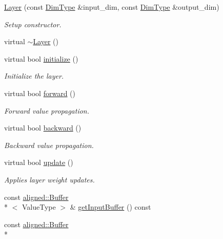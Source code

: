 \begin{DoxyCompactItemize}
\item 
\hyperlink{classffnn_1_1layer_1_1_layer_a693c59cfa760fdd695780c6f44226b88}{Layer} (const \hyperlink{classffnn_1_1layer_1_1internal_1_1_interface_a8d121d0103f254b51e48f7b20a17681f}{Dim\-Type} \&input\-\_\-dim, const \hyperlink{classffnn_1_1layer_1_1internal_1_1_interface_a8d121d0103f254b51e48f7b20a17681f}{Dim\-Type} \&output\-\_\-dim)
\begin{DoxyCompactList}\small\item\em Setup constructor. \end{DoxyCompactList}\item 
virtual \hyperlink{classffnn_1_1layer_1_1_layer_aa466bcb2ac40d059e9b6e40be157d1b4}{$\sim$\-Layer} ()
\item 
virtual bool \hyperlink{classffnn_1_1layer_1_1_layer_ae8a7daa81382a7965b8ab8861da7e522}{initialize} ()
\begin{DoxyCompactList}\small\item\em Initialize the layer. \end{DoxyCompactList}\item 
virtual bool \hyperlink{classffnn_1_1layer_1_1_layer_a832518de9beb442be0764e49ab24d78d}{forward} ()
\begin{DoxyCompactList}\small\item\em Forward value propagation. \end{DoxyCompactList}\item 
virtual bool \hyperlink{classffnn_1_1layer_1_1_layer_a59d5f45393a1b0e4673969c65faaae2a}{backward} ()
\begin{DoxyCompactList}\small\item\em Backward value propagation. \end{DoxyCompactList}\item 
virtual bool \hyperlink{classffnn_1_1layer_1_1_layer_a25bf06cfea93baf1c80e21d0a88a5e4a}{update} ()
\begin{DoxyCompactList}\small\item\em Applies layer weight updates. \end{DoxyCompactList}\item 
const \hyperlink{structffnn_1_1aligned_1_1_buffer}{aligned\-::\-Buffer}\\*
$<$ Value\-Type $>$ \& \hyperlink{classffnn_1_1layer_1_1_layer_abf62ff8eedf0f084addef496771cac49}{get\-Input\-Buffer} () const 
\item 
const \hyperlink{structffnn_1_1aligned_1_1_buffer}{aligned\-::\-Buffer}\\*

\end{DoxyCompactItemize}
